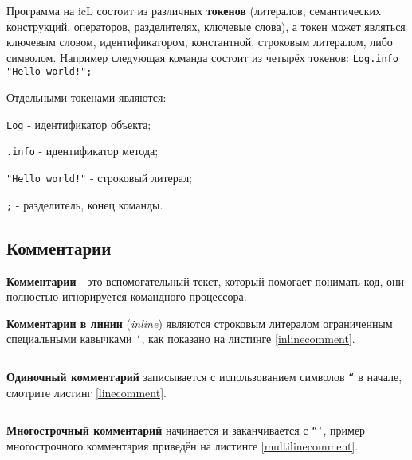 Программа на icL состоит из различных \textbf{токенов} (литералов, семантических конструкций, операторов, разделителях, ключевые слова), а токен может являться ключевым словом, идентификатором, константной, строковым литералом, либо символом. Например следующая команда состоит из четырёх токенов: \texttt{Log.info "Hello world!";}

Отдельными токенами являются:

\begin{icItems}
\item
	\texttt{Log} - идентификатор объекта;
\item
	\texttt{.info} - идентификатор метода;
\item
	\texttt{"Hello world!"} - строковый литерал;
\item
	\texttt{;} - разделитель, конец команды.
\end{icItems}

\subsection{Комментарии}

\textbf{Комментарии} - это вспомогательный текст, который помогает понимать код, они полностью игнорируется командного процессора.

\textbf{Комментарии в линии} (\textit{inline}) являются строковым литералом ограниченным специальными кавычками \texttt{`}, как показано на листинге \ref{inlinecomment}.

\begin{sourcecode}
	\label{inlinecomment}
    \inputminted[linenos]{icl}{../sources/inlinecomment.icL}
\end{sourcecode}

\textbf{Одиночный комментарий} записывается с использованием символов \texttt{``} в начале, смотрите листинг \ref{linecomment}.

\begin{sourcecode}
	\label{linecomment}
    \inputminted[linenos]{icl}{../sources/linecomment.icL}
\end{sourcecode}

\textbf{Многострочный комментарий} начинается и заканчивается с \texttt{```}, пример многострочного комментария приведён на листинге \ref{multilinecomment}.

\begin{sourcecode}
	\label{multilinecomment}
    \inputminted[linenos]{icl}{../sources/multilinecomment.icL}
\end{sourcecode}

